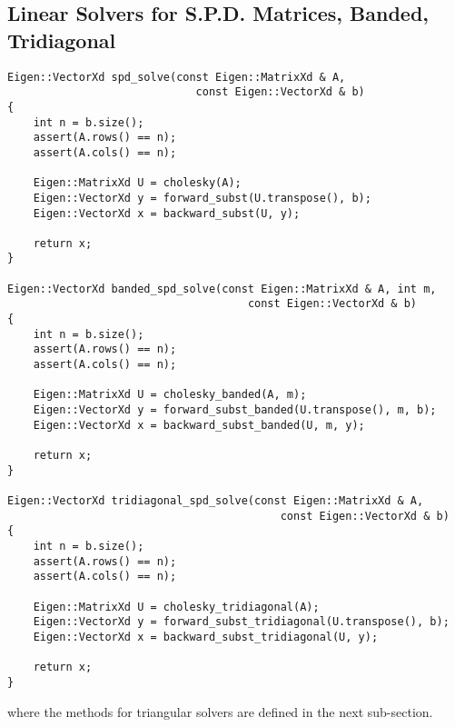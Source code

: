 \documentclass[paper=a4, fontsize=11pt]{scrartcl} %
\numberwithin{equation}{section} %
\numberwithin{figure}{section} %
\numberwithin{table}{section} %
\begin{document}
\subsection{Linear Solvers for S.P.D. Matrices, Banded, Tridiagonal}
\begin{lstlisting}
Eigen::VectorXd spd_solve(const Eigen::MatrixXd & A, 
                             const Eigen::VectorXd & b)
{
    int n = b.size();
    assert(A.rows() == n);
    assert(A.cols() == n);

    Eigen::MatrixXd U = cholesky(A);
    Eigen::VectorXd y = forward_subst(U.transpose(), b);
    Eigen::VectorXd x = backward_subst(U, y);
    
    return x;
}

Eigen::VectorXd banded_spd_solve(const Eigen::MatrixXd & A, int m,
                                     const Eigen::VectorXd & b)
{
    int n = b.size();
    assert(A.rows() == n);
    assert(A.cols() == n);

    Eigen::MatrixXd U = cholesky_banded(A, m);
    Eigen::VectorXd y = forward_subst_banded(U.transpose(), m, b);
    Eigen::VectorXd x = backward_subst_banded(U, m, y);
    
    return x;
}

Eigen::VectorXd tridiagonal_spd_solve(const Eigen::MatrixXd & A, 
                                          const Eigen::VectorXd & b)
{
    int n = b.size();
    assert(A.rows() == n);
    assert(A.cols() == n);

    Eigen::MatrixXd U = cholesky_tridiagonal(A);
    Eigen::VectorXd y = forward_subst_tridiagonal(U.transpose(), b);
    Eigen::VectorXd x = backward_subst_tridiagonal(U, y);
    
    return x;
}
\end{lstlisting}
where the methods for triangular solvers are defined in the next sub-section.

\newpage
\end{document}
